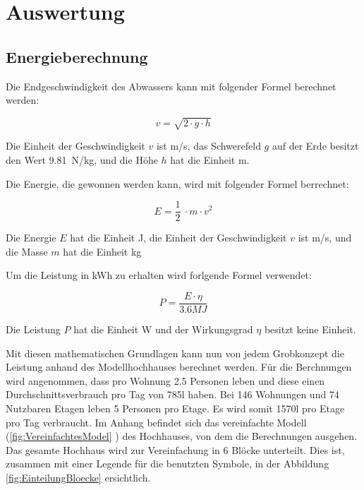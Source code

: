 \section{Auswertung} \label{sec:auswertung}



\subsection{Energieberechnung} \label{subsec:energieberechnung}

Die Endgeschwindigkeit des Abwassers kann mit folgender Formel berechnet werden:
\begin{center}
\[
	v = \sqrt{2 \cdot g \cdot h}
\]
\end{center}

Die Einheit der Geschwindigkeit \(v\) ist \si{m/s}, das Schwerefeld \(g\) auf der Erde besitzt den Wert 9.81~\si{N/kg}, und die Höhe \(h\) hat die Einheit \si{m}.

\bigskip

Die Energie, die gewonnen werden kann, wird mit folgender Formel berrechnet:

\begin{center}
\[
	E =\frac 12\ \cdot m \cdot v^2
\]
\end{center}

Die Energie \(E\) hat die Einheit \si{J}, die Einheit der Geschwindigkeit \(v\) ist \si{m/s}, und die Masse \(m\) hat die Einheit \si{kg}

\bigskip

Um die Leistung in \si{kWh} zu erhalten wird forlgende Formel verwendet:

\begin{center}
\[
	P = \frac{E \cdot \eta}{3.6\si{MJ}}
\]
\end{center}

Die Leistung \(P\) hat die Einheit \si{W} und der Wirkungsgrad \(\eta\) besitzt keine Einheit.

\newpage

Mit diesen mathematischen Grundlagen kann nun von jedem Grobkonzept die Leistung anhand des Modellhochhauses berechnet werden. Für die Berchnungen wird angenommen, dass pro Wohnung 2.5 Personen leben und diese einen Durchschnittsverbrauch pro Tag von 785\si{l} haben. Bei 146 Wohnungen und 74 Nutzbaren Etagen leben 5 Personen pro Etage. Es wird somit 1570\si{l} pro Etage pro Tag verbraucht. Im Anhang befindet sich das vereinfachte Modell (\ref{fig:VereinfachtesModel} ) des Hochhauses, von dem die Berechnungen ausgehen. Das gesamte Hochhaus wird zur Vereinfachung in 6 Blöcke unterteilt. Dies ist, zusammen mit einer Legende für die benutzten Symbole, in der Abbildung \ref{fig:EinteilungBloecke}  ersichtlich.

